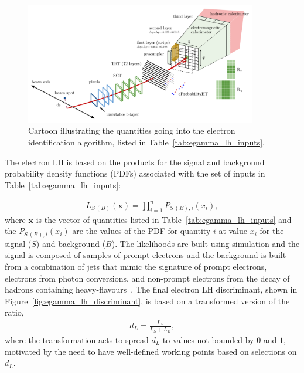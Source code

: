 \begin{figure}[!htb]
    \begin{center}
        \includegraphics[width=0.9\textwidth]{figures/chapter3/egamma/egamma_lh_input_desc}
        \caption{
            Cartoon illustrating the quantities going into the electron identification algorithm,
            listed in Table~\ref{tab:egamma_lh_inputs}.
        }
        \label{fig:egamma_lh_input_desc}
    \end{center}
\end{figure}

The electron LH is based on the products for the signal and background probability density
functions (PDFs) associated with the set of inputs in Table~\ref{tab:egamma_lh_inputs}:

\begin{align}
    L_{S\,(B)}(\mathbf{x}) = \prod\limits_{i=1}^n P_{S\,(B),i} (x_i),
    \label{eq:egamma_lh}
\end{align}
where $\mathbf{x}$ is the vector of quantities listed in Table~\ref{tab:egamma_lh_inputs} and
the $P_{S\,(B),i}(x_i)$ are the values of the PDF for quantity $i$ at value $x_i$ for the
signal ($S$) and background ($B$).
The likelihoods are built using simulation and the signal is composed of samples of prompt electrons
and the background is built from a combination of jets that mimic the signature of
prompt electrons, electrons from photon conversions, and non-prompt electrons from the decay
of hadrons containing heavy-flavours~\cite{Aad:2019tso}.
The final electron LH discriminant, shown in Figure~\ref{fig:egamma_lh_discriminant}, is based on a transformed version of the ratio,
\begin{align}
    d_L = \frac{L_S}{L_S + L_B},
    \label{eq:egamma_lh_disc}
\end{align}
where the transformation acts to spread $d_L$ to values not bounded by $0$ and $1$,
motivated by the need to have well-defined working points based on selections on $d_L$.

